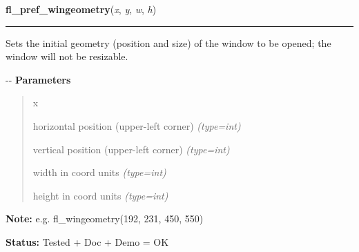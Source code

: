 \hspace{.8\funcindent}\begin{boxedminipage}{\funcwidth}

    \raggedright \textbf{fl\_pref\_wingeometry}(\textit{x}, \textit{y}, \textit{w}, \textit{h})

    \vspace{-1.5ex}

    \rule{\textwidth}{0.5\fboxrule}
\setlength{\parskip}{2ex}

Sets the initial geometry (position and size) of the window to be
opened; the window will not be resizable.

-{}-
\setlength{\parskip}{1ex}
      \textbf{Parameters}
      \vspace{-1ex}

      \begin{quote}
        \begin{Ventry}{x}

          \item[x]


horizontal position (upper-left corner)
            {\it (type=int)}

          \item[y]


vertical position (upper-left corner)
            {\it (type=int)}

          \item[w]


width in coord units
            {\it (type=int)}

          \item[h]


height in coord units
            {\it (type=int)}

        \end{Ventry}

      \end{quote}

\textbf{Note:} 
e.g. fl\_wingeometry(192, 231, 450, 550)


\textbf{Status:} 
Tested + Doc + Demo = OK


    \end{boxedminipage}

    \label{xformslib:flxbasic:fl_initial_wingeometry}

    \vspace{0.5ex}

